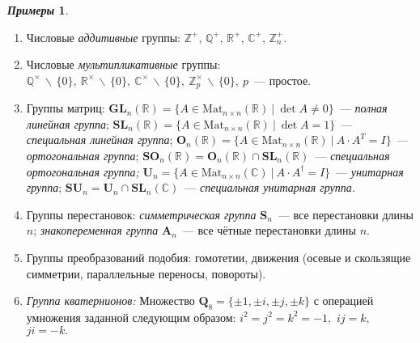 \documentclass[a4paper, 14pt]{extarticle}
\newcommand{\integers}{\mathbb{Z}}
\newcommand{\rationals}{\mathbb{Q}}
\newcommand{\real}{\mathbb{R}}
\newcommand{\complex}{\mathbb{C}}
\newcommand{\GL}{\mathbf{GL}}
\newcommand{\SL}{\mathbf{SL}}
\newcommand{\Orth}{\mathbf{O}}
\newcommand{\SOrth}{\mathbf{SO}}
\newcommand{\Unit}{\mathbf{U}}
\newcommand{\SUnit}{\mathbf{SU}}
\newcommand{\symmetrical}{\mathbf{S}}
\newcommand{\alternating}{\mathbf{A}}
\theoremstyle{definition}
\newtheorem*{exmpls}{\textit{Примеры}}
\theoremstyle{plain}
\numberwithin{theorem}{section}
\numberwithin{definition}{section}
\numberwithin{statement}{section}
\numberwithin{lemma}{section}
\numberwithin{consequence}{section}
\begin{document}
	\begin{exmpls}
		\
		\begin{enumerate}
			\setlength\itemsep{0.1em}
			\item Числовые \textit{аддитивные} группы: \newline
			$\integers ^ +, \, \rationals ^ +, \, \real ^ +, \, \complex ^ +, \, 
			\integers_n ^ +.$ 
			\item Числовые \textit{мультипликативные} группы: \newline
			$\rationals ^ {\times} \, \backslash \, \{0\}, \
			\real ^ {\times} \, \backslash \, \{0\}, \
			\complex ^ {\times} \, \backslash \, \{0\}, \
			\integers_p ^ {\times} \, \backslash \, \{0\}, \ p$~--- простое.
			\item Группы матриц: \newline
			${\GL_n(\real) = \{A \in \mathrm{Mat}_{n \times n}(\real) \ | \ \det A \neq 0 \}}$~--- \textit{полная линейная группа}; \newline
			${\SL_n(\real) = \{A \in \mathrm{Mat}_{n \times n}(\real) \ | \ \det A = 1 \}}$~--- \textit{специальная линейная
				группа}; \newline
			${\Orth_n(\real)} = \{A \in \mathrm{Mat}_{n \times n}(\real) \ | \ A \cdot A^T = I\}$~--- \textit{ортогональная группа}; \newline
			${\SOrth_n(\real) = \Orth_n(\real) \cap \SL_n(\real)}$~--- \textit{специальная ортогональная группа;} \newline
                ${\Unit_n = \{A \in \mathrm{Mat}_{n \times n}(\complex) \ | \ A \cdot A^\dagger = I\}}$~--- \textit{унитарная группа}; \newline
                ${\SUnit_n = \Unit_n \cap \SL_n(\complex)}$~--- \textit{специальная унитарная группа.}
			\item Группы перестановок: \newline
			\textit{симметрическая группа} $\symmetrical_n$~--- все перестановки длины $n$;\newline
			\textit{знакопеременная группа} $\alternating_n$~--- все чётные перестановки длины $n$.
			\item Группы преобразований подобия: гомотетии, движения (осевые и скользящие симметрии, параллельные переносы, повороты).
                \item \textit{Группа кватернионов:} \newline
                Множество ${\mathbf{Q}_8 = \{\pm 1, \pm i, \pm j, \pm k\}}$ с операцией умножения заданной следующим образом: ${i^2 = j^2 = k^2 = -1,}$ ${ij = k,}$ ${ji = -k.}$
		\end{enumerate}
	\end{exmpls}
\end{document}
